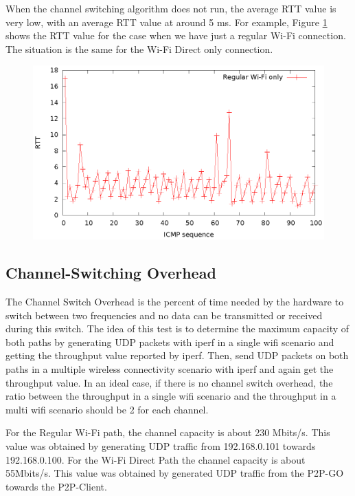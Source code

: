 When the channel switching algorithm does not run, the average RTT value is very low, with an average RTT value at around 5 ms. For example, Figure \ref{img:regularwifionly} shows the RTT value for the case when we have just a regular Wi-Fi connection. The situation is the same for the Wi-Fi Direct only connection.

\begin{figure}[h!]
\includegraphics{src/img/regularwifionly.eps}
\label{img:regularwifionly}
\end{figure}

\newpage
\subsection{Channel-Switching Overhead}
\label{sub-sec:chsw-overhead}

The Channel Switch Overhead is the percent of time needed by the hardware to switch between two frequencies and no data can be transmitted or received during this switch. The idea of this test is to determine the maximum capacity of both paths by generating UDP packets with iperf in a single wifi scenario and getting the throughput value reported by iperf. Then, send UDP packets on both paths in a multiple wireless connectivity scenario with iperf and again get the throughput value. In an ideal case, if there is no channel switch overhead, the ratio between the throughput in a single wifi scenario and the throughput in a multi wifi scenario should be 2 for each channel.

For the Regular Wi-Fi path, the channel capacity is  about 230 Mbits/s. This value was obtained by generating UDP traffic from 192.168.0.101 towards 192.168.0.100. For the Wi-Fi Direct Path the channel capacity is about 55Mbits/s. This value was obtained by generated UDP traffic from the P2P-GO towards the P2P-Client.

